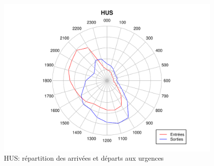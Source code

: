 \documentclass[12pt,english,french,twoside]{book}\usepackage[]{graphicx}\usepackage[]{color}
\makeatletter
\def\maxwidth{ %
  \ifdim\Gin@nat@width>\linewidth
    \linewidth
  \else
    \Gin@nat@width
  \fi
}
\newenvironment{knitrout}{}{} %
\makeatother
\begin{document}
\begin{figure}
\begin{center}
\begin{knitrout}
\color{fgcolor}
\includegraphics[width=\maxwidth]{figure/test2} 

\end{knitrout}

\end{center}
\caption{HUS: répartition des arrivées et départs aux urgences}
\label{passage:hus}
\end{figure}
\end{document}
